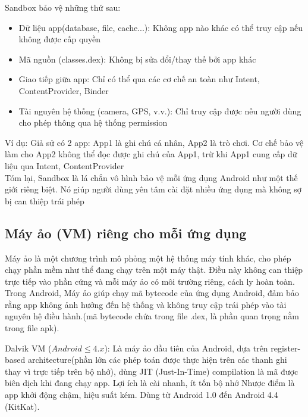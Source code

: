     \begin{flushleft}
      \hspace*{0.8cm}Sandbox bảo vệ những thứ sau:
      \setlength{\leftmargini}{1.5cm}
      \begin{itemize}
          \item Dữ liệu app(database, file, cache...): Không app nào khác có thể truy cập nếu không được cấp quyền
            \item Mã nguồn (classes.dex): Không bị sửa đổi/thay thế bởi app khác
            \item Giao tiếp giữa app: Chỉ có thể qua các cơ chế an toàn như Intent, ContentProvider, Binder
            \item Tài nguyên hệ thống (camera, GPS, v.v.): Chỉ truy cập được nếu người dùng cho phép thông qua hệ thống permission
        \end{itemize}
        \hspace*{0.8cm}Ví dụ: Giả sử có 2 app:
        App1 là ghi chú cá nhân,
        App2 là trò chơi.
        Cơ chế bảo vệ làm cho App2 không thể đọc được ghi chú của App1, trừ khi App1 cung cấp dữ liệu qua Intent, ContentProvider\\
        \hspace*{0.8cm}Tóm lại, Sandbox là lá chắn vô hình bảo vệ mỗi ứng dụng Android như một thế giới riêng biệt. Nó giúp người dùng yên tâm cài đặt nhiều ứng dụng mà không sợ bị can thiệp trái phép
  \end{flushleft}

\subsection{Máy ảo (VM) riêng cho mỗi ứng dụng}

\begin{flushleft}
  \hspace*{0.8cm}Máy ảo là một chương trình mô phỏng một hệ thống máy tính khác, cho phép chạy phần mềm như thể đang chạy trên một máy thật. Điều này không can thiệp trực tiếp vào phần cứng và mỗi máy ảo có môi trường riêng, cách ly hoàn toàn. Trong Android, Máy ảo giúp chạy mã bytecode của ứng dụng Android, đảm bảo rằng app không ảnh hưởng đến hệ thống và không truy cập trái phép vào tài nguyên hệ điều hành.(mã bytecode chứa trong file .dex, là phần quan trọng nằm trong file apk).
\end{flushleft}

\begin{flushleft}
  \hspace*{0.8cm}Dalvik VM ($Android \leq 4.x$): Là máy ảo đầu tiên của Android, dựa trên register-based architecture(phần lớn các phép toán được thực hiện trên các thanh ghi thay vì trực tiếp trên bộ nhớ), dùng JIT (Just-In-Time) compilation là mã được biên dịch khi đang chạy app. Lợi ích là cài nhanh, ít tốn bộ nhớ
  Nhược điểm là app khởi động chậm, hiệu suất kém.
  Dùng từ Android 1.0 đến Android 4.4 (KitKat).  
\end{flushleft}

